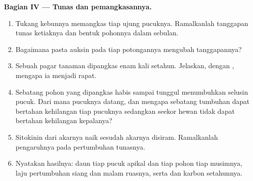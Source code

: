 \begin{problem}
\medskip
\noindent\textbf{Bagian IV --- Tunas dan pemangkasannya.}
\begin{enumerate}[resume]
  \item Tukang kebunnya memangkas tiap ujung pucuknya. Ramalkanlah
        tanggapan tunas ketiaknya dan bentuk pohonnya dalam sebulan.
  \item Bagaimana pasta auksin pada tiap potongannya mengubah
        tanggapannya?
  \item Sebuah pagar tanaman dipangkas enam kali setahun. Jelaskan,
        dengan , mengapa ia menjadi rapat.
  \item Sebatang pohon yang dipangkas habis sampai tunggul menumbuhkan
        selusin pucuk. Dari mana pucuknya datang, dan mengapa sebatang
        tumbuhan dapat bertahan kehilangan tiap pucuknya sedangkan
        seekor hewan tidak dapat bertahan kehilangan kepalanya?
  \item Sitokinin dari akarnya naik sesudah akarnya disiram.
        Ramalkanlah pengaruhnya pada pertumbuhan tunasnya.
  \item Nyatakan hasilnya: daun tiap pucuk apikal dan tiap pohon tiap
        musimnya, laju pertumbuhan siang dan malam ruasnya, serta 
        dan karbon setahunnya.
\end{enumerate}
\end{problem}
